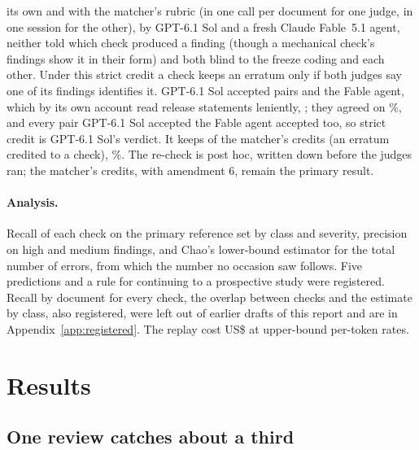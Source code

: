\documentclass[11pt]{article}
\begin{document}
its own and with the matcher's rubric (in one call per document for one judge, in one session for the other), by GPT-6.1 Sol and a fresh Claude Fable~5.1 agent, neither told which check produced a finding (though a mechanical
check's findings show it in their form) and both blind to the freeze coding
and each other. Under this strict credit a check keeps an erratum only if both judges say one of its findings identifies it.
GPT-6.1 Sol accepted \StrictYesGpt{} pairs and the Fable agent, which by its own account read release statements leniently,
\StrictYesFable; they agreed on \StrictJudgeAgree\%, and every pair GPT-6.1 Sol accepted the Fable agent accepted too, so strict credit is
GPT-6.1 Sol's verdict. It keeps \StrictKept{} of the matcher's \StrictCredits{} credits (an
erratum credited to a check), \StrictKeptPct\%. The re-check
is post hoc, written down before the judges ran; the matcher's credits, with amendment 6, remain the primary result.

\paragraph{Analysis.} Recall of each check on the primary reference set by class and severity, precision on high and medium
findings, and Chao's lower-bound estimator \citep{chao1987} for the total number of errors, from which the number no occasion
saw follows. Five predictions and a rule
for continuing to a prospective study were registered. Recall by document for every check, the overlap between checks and the
estimate by class, also registered, were left out of earlier drafts of this report and are in Appendix~\ref{app:registered}. The replay cost US\$\CostRone{} at upper-bound per-token rates.

\section{Results}

\subsection{One review catches about a third}
\end{document}
